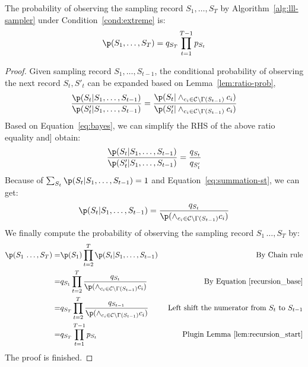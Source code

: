 \begin{lemma} \label{lem:sample-record}
The probability of observing the sampling record  $S_1,\ldots,S_T$ by Algorithm~\ref{alg:lll-sampler} under Condition~\ref{cond:extreme} is:
\begin{equation}\label{pS_final}
    \p(S_1,\ldots ,S_T)=q_{S_T} \prod_{t=1}^{T-1} p_{S_t} 
\end{equation}
\begin{proof}
Given sampling record  $S_1,\ldots,S_{t-1}$, the conditional probability of observing the next record {$S_t,S'_t$} can be expanded  based on Lemma~\ref{lem:ratio-prob},
\begin{equation*}
\frac{\p(S_t | S_1, \ldots, S_{t-1})}{\p(S'_t | S_1, \ldots, S_{t-1})}=\frac{\p(S_t |\wedge_{c_i \in \mathcal{C}\backslash \Gamma(S_{t-1})}c_i)}{\p(S'_t |\wedge_{c_i \in \mathcal{C}\backslash \Gamma(S_{t-1})}c_i)}
\end{equation*}
Based on Equation~\eqref{eq:bayes}, we {can simplify the RHS of the above ratio equality and}] obtain:
\begin{equation*}
\frac{\p(S_t | S_1, \ldots, S_{t-1})}{\p(S'_t | S_1, \ldots, S_{t-1})}=\frac{q_{S_t}}{q_{S'_t}}
\end{equation*}
Because of $\sum_{S_t}\p(S_t | S_1, \ldots, S_{t-1})=1$ and Equation~\eqref{eq:summation-st}, we can get:
\begin{equation}\label{recursion_base}
  \p(S_t | S_1, \ldots, S_{t-1})=  \frac{q_{S_t}}{\p(\wedge_{c_i \in \mathcal{C}\backslash \Gamma(S_{t-1})}c_i)}
\end{equation}
We finally compute the probability of observing the sampling record $S_1\,\ldots, S_T$ by:
\begin{equation*}
\begin{aligned} 
    \p(S_1\,\ldots ,S_T)=&   \p(S_1)\prod_{t=2}^T\p(S_t | S_1,\ldots,S_{t-1})  &\text{ By Chain rule}\\
    =&q_{S_1}\prod_{t=2}^T \frac{q_{S_t}}{\p(\wedge_{c_i \in \mathcal{C}\backslash \Gamma(S_{t-1})}c_i)}  &\text{ By Equation~\eqref{recursion_base}}\\
    =&q_{S_T} \prod_{t=2}^T \frac{q_{S_{t-1}}}{\p(\wedge_{c_i \in \mathcal{C}\backslash \Gamma(S_{t-1})}c_i)}  &\text{ Left shift the numerator from $S_t$ to $S_{t-1}$}\\
    =&q_{S_T} \prod_{t=1}^{T-1} p_{S_t} & \text{Plugin  Lemma~\ref{lem:recursion_start}}
\end{aligned}    
\end{equation*}
The proof is finished.
\end{proof}
\end{lemma}




